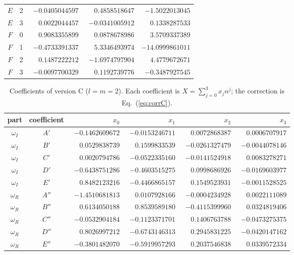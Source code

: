\begin{table}[t]
\begin{tabular}{cc rrr}
$E$ & 2 & $-0.0405044597$ & $\phantom{-}0.4858518647$ & $-1.5022013045$ \\
$E$ & 3 & $\phantom{-}0.0022044457$ & $-0.0341005912$ & $\phantom{-}0.1338287533$ \\
$F$ & 0 & $\phantom{-}0.9083355899$ & $\phantom{-}0.0878678986$ & $\phantom{-}3.5709337389$ \\
$F$ & 1 & $-0.4733391337$ & $\phantom{-}5.3346493974$ & $-14.0999861011$ \\
$F$ & 2 & $\phantom{-}0.1487222212$ & $-1.6974797904$ & $\phantom{-}4.4779672671$ \\
$F$ & 3 & $-0.0097700329$ & $\phantom{-}0.1192739776$ & $-0.3487927545$ \\
\hline
\hline\end{tabular}\end{table}
\begin{table}[t]\centering\footnotesize
\caption{Coefficients of version C ($l=m=2$). Each coefficient is $X=\sum_{j=0}^{3}x_j n^j$; the correction is Eq.~(\ref{eq:corrC}).}
\label{tab:coefC}
\begin{tabular}{cc rrrr}\hline\hline
part & coefficient & $x_0$ & $x_1$ & $x_2$ & $x_3$ \\ \hline
$\omega_I$ & $A'$ & $-0.1462609672$ & $-0.0153246711$ & $\phantom{-}0.0072868387$ & $\phantom{-}0.0006707917$ \\
$\omega_I$ & $B'$ & $\phantom{-}0.0529838739$ & $\phantom{-}0.1599833539$ & $-0.0261327479$ & $-0.0044078146$ \\
$\omega_I$ & $C'$ & $\phantom{-}0.0020794786$ & $-0.0522335160$ & $-0.0141524918$ & $\phantom{-}0.0083278271$ \\
$\omega_I$ & $D'$ & $-0.6438751286$ & $-0.4603515275$ & $\phantom{-}0.0998686926$ & $-0.0169603977$ \\
$\omega_I$ & $E'$ & $\phantom{-}0.8482123216$ & $-0.4466865157$ & $\phantom{-}0.1549523931$ & $-0.0011528525$ \\
\hline
$\omega_R$ & $A''$ & $-1.4510681813$ & $\phantom{-}0.0107928166$ & $-0.0004234928$ & $\phantom{-}0.0022111089$ \\
$\omega_R$ & $B''$ & $\phantom{-}0.6134050188$ & $\phantom{-}0.8539589180$ & $-0.4115399960$ & $\phantom{-}0.0324819406$ \\
$\omega_R$ & $C''$ & $-0.0532904184$ & $-0.1123371701$ & $\phantom{-}0.1406763788$ & $-0.0473275375$ \\
$\omega_R$ & $D''$ & $\phantom{-}0.8026997212$ & $-0.6743146313$ & $\phantom{-}0.2945831225$ & $-0.0420147162$ \\
$\omega_R$ & $E''$ & $-0.3801482070$ & $-0.5919957293$ & $\phantom{-}0.2037546838$ & $\phantom{-}0.0339572334$ \\
\hline
\hline\end{tabular}\end{table}
